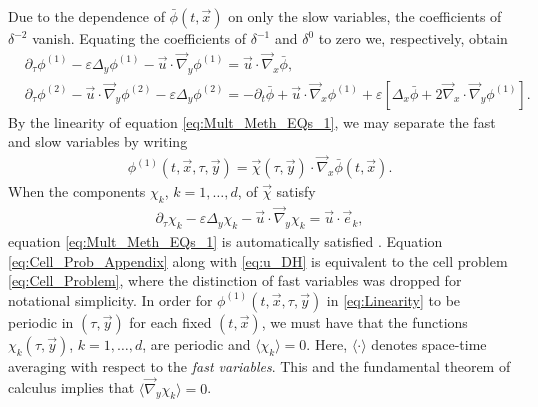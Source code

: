\documentclass[11pt]{amsart}
\begin{document}
Due to the dependence of $\bar{\phi}(t,\vec{x})$ on only the
slow variables, the coefficients of $\delta^{-2}$ vanish. Equating the
coefficients of $\delta^{-1}$ and $\delta^0$ to zero we, respectively, obtain 
%
\begin{align}
  \label{eq:Mult_Meth_EQs_1}
  &\partial_\tau\phi^{(1)}-\varepsilon\Delta_y\phi^{(1)}-\vec{u}\cdot\vec{\nabla}_y\phi^{(1)}=\vec{u}\cdot\vec{\nabla}_x\bar{\phi},
  \\
  \label{eq:Mult_Meth_EQs_2}
  &\partial_\tau\phi^{(2)}-\vec{u}\cdot\vec{\nabla}_y\phi^{(2)}-\varepsilon\Delta_y\phi^{(2)}
  =-\partial_t\bar{\phi}+\vec{u}\cdot\vec{\nabla}_x\phi^{(1)}+\varepsilon[\Delta_x\bar{\phi}+2\vec{\nabla}_x\cdot\vec{\nabla}_y\phi^{(1)}].
\end{align}
%
By the linearity of equation \eqref{eq:Mult_Meth_EQs_1}, we may
separate the fast and slow variables by writing
\cite{McLaughlin:SIAM_JAM:780}
%
\begin{align}\label{eq:Linearity}
  \phi^{(1)}(t,\vec{x},\tau,\vec{y})
    =%
    \vec{\chi}(\tau,\vec{y})\cdot\vec{\nabla}_x\bar{\phi}(t,\vec{x}).
\end{align}
%
When
the components $\chi_k$, $k=1,\ldots,d$, of $\vec{\chi}$ satisfy   
%
\begin{align}\label{eq:Cell_Prob_Appendix}
  \partial_\tau\chi_k-\varepsilon\Delta_y\chi_k-\vec{u}\cdot\vec{\nabla}_y\chi_k=\vec{u}\cdot\vec{e}_k,
\end{align}
%
equation \eqref{eq:Mult_Meth_EQs_1} is automatically satisfied
\cite{McLaughlin:SIAM_JAM:780}. Equation \eqref{eq:Cell_Prob_Appendix}
along with \eqref{eq:u_DH} is equivalent to the cell problem
\eqref{eq:Cell_Problem}, where the distinction of fast variables was
dropped for notational simplicity. In order for
$\phi^{(1)}(t,\vec{x},\tau,\vec{y})$ in \eqref{eq:Linearity} to be periodic  
in $(\tau,\vec{y})$ for each fixed $(t,\vec{x})$, we must have that the
functions $\chi_k(\tau,\vec{y})$, $k=1,\ldots,d$, are periodic and
$\langle\chi_k\rangle=0$. Here, $\langle\cdot\rangle$ denotes space-time averaging with respect to
the \emph{fast variables}. This and the fundamental theorem of
calculus implies that $\langle\vec{\nabla}_y\chi_k\rangle=0$. 
\end{document}
